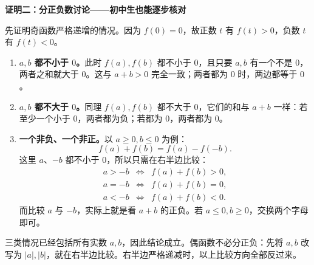 \clearpage
\begin{proofbox}
\textbf{\textcolor{CProof}{证明二：分正负数讨论——初中生也能逐步核对}}



先证明奇函数严格递增的情况。因为 $f(0)=0$，故正数 $t$ 有 $f(t)>0$，负数 $t$ 有 $f(t)<0$。
\begin{enumerate}[leftmargin=*,itemsep=0.45em]
  \item \textbf{$a,b$ 都不小于 $0$。}此时 $f(a),f(b)$ 都不小于 $0$，且只要 $a,b$ 有一个不是 $0$，两者之和就大于 $0$。这与 $a+b>0$ 完全一致；两者都为 $0$ 时，两边都等于 $0$。
  \item \textbf{$a,b$ 都不大于 $0$。}同理 $f(a),f(b)$ 都不大于 $0$，它们的和与 $a+b$ 一样：若至少一个小于 $0$，两者都为负；若都为 $0$，两者都为 $0$。
  \item \textbf{一个非负、一个非正。}以 $a\geqslant0,b\leqslant0$ 为例：
  \[
   f(a)+f(b)=f(a)-f(-b).
  \]
  这里 $a$、$-b$ 都不小于 $0$，所以只需在右半边比较：
  \[
  \begin{array}{rcl}
    a>-b&\Longleftrightarrow&f(a)+f(b)>0,\\
    a=-b&\Longleftrightarrow&f(a)+f(b)=0,\\
    a<-b&\Longleftrightarrow&f(a)+f(b)<0.
  \end{array}
  \]
  而比较 $a$ 与 $-b$，实际上就是看 $a+b$ 的正负。若 $a\leqslant0,b\geqslant0$，交换两个字母即可。
\end{enumerate}
三类情况已经包括所有实数 $a,b$，因此结论成立。偶函数不必分正负：先将 $a,b$ 改写为 $|a|,|b|$，就在右半边比较。右半边严格递减时，以上比较方向全部反过来。

\medskip

\end{proofbox}
\clearpage
